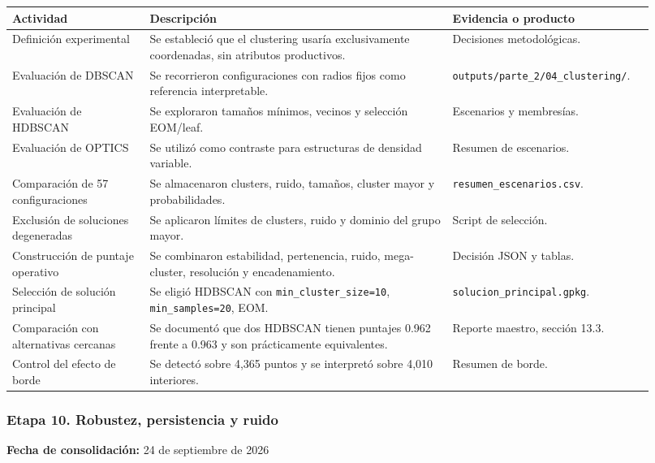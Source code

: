 \documentclass[
  spanish,
]{article}
\newcounter{none} %
\begin{document}
{\def\LTcaptype{none} %
\begin{longtable}[]{@{}p{0.20\linewidth}p{0.44\linewidth}p{0.28\linewidth}@{}}
\toprule\noalign{}
Actividad & Descripción & Evidencia o producto \\
\midrule\noalign{}
\endhead
\bottomrule\noalign{}
\endlastfoot
Definición experimental & Se estableció que el clustering usaría
exclusivamente coordenadas, sin atributos productivos. & Decisiones
metodológicas. \\
Evaluación de DBSCAN & Se recorrieron configuraciones con radios fijos
como referencia interpretable. &
\texttt{outputs/parte\_2/04\_clustering/}. \\
Evaluación de HDBSCAN & Se exploraron tamaños mínimos, vecinos y
selección EOM/leaf. & Escenarios y membresías. \\
Evaluación de OPTICS & Se utilizó como contraste para estructuras de
densidad variable. & Resumen de escenarios. \\
Comparación de 57 configuraciones & Se almacenaron clusters, ruido,
tamaños, cluster mayor y probabilidades. &
\texttt{resumen\_escenarios.csv}. \\
Exclusión de soluciones degeneradas & Se aplicaron límites de clusters,
ruido y dominio del grupo mayor. & Script de selección. \\
Construcción de puntaje operativo & Se combinaron estabilidad,
pertenencia, ruido, mega-cluster, resolución y encadenamiento. &
Decisión JSON y tablas. \\
Selección de solución principal & Se eligió HDBSCAN con
\texttt{min\_cluster\_size=10}, \texttt{min\_samples=20}, EOM. &
\texttt{solucion\_principal.gpkg}. \\
Comparación con alternativas cercanas & Se documentó que dos HDBSCAN
tienen puntajes 0.962 frente a 0.963 y son prácticamente equivalentes. &
Reporte maestro, sección 13.3. \\
Control del efecto de borde & Se detectó sobre 4,365 puntos y se
interpretó sobre 4,010 interiores. & Resumen de borde. \\
\end{longtable}
}

\subsubsection{Etapa 10. Robustez, persistencia y
ruido}\label{etapa-10-robustez-persistencia-y-ruido}

\textbf{Fecha de consolidación:} 24 de septiembre de 2026
\end{document}
